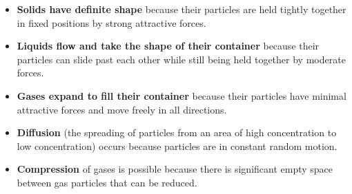 \begin{itemize}
    \item \textbf{Solids have definite shape} because their particles are held tightly together in fixed positions by strong attractive forces.
    
    \item \textbf{Liquids flow and take the shape of their container} because their particles can slide past each other while still being held together by moderate forces.
    
    \item \textbf{Gases expand to fill their container} because their particles have minimal attractive forces and move freely in all directions.
    
    \item \textbf{Diffusion} (the spreading of particles from an area of high concentration to low concentration) occurs because particles are in constant random motion.
    
    \item \textbf{Compression} of gases is possible because there is significant empty space between gas particles that can be reduced.
\end{itemize}

